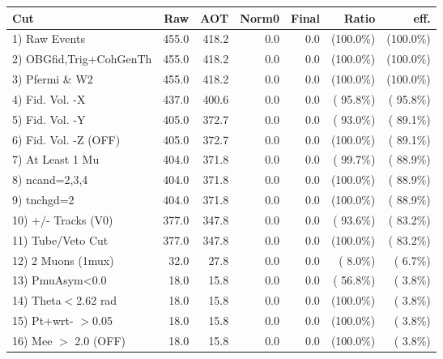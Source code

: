  \begin{table}[h!]\centering
 \begin{tabular}{||l||r|r|r|r|r|r||}
 \hline
 \hline
 Cut & Raw & AOT & Norm0 & Final & Ratio & eff.       \\
 \hline
  1) Raw Events           &        455.0 &        418.2 &          0.0 &          0.0 & (100.0\%) & (100.0\%) \\
  2) OBGfid,Trig+CohGenTh &        455.0 &        418.2 &          0.0 &          0.0 & (100.0\%) & (100.0\%) \\
  3) Pfermi \& W2         &        455.0 &        418.2 &          0.0 &          0.0 & (100.0\%) & (100.0\%) \\
  4) Fid. Vol. -X         &        437.0 &        400.6 &          0.0 &          0.0 & ( 95.8\%) & ( 95.8\%) \\
  5) Fid. Vol. -Y         &        405.0 &        372.7 &          0.0 &          0.0 & ( 93.0\%) & ( 89.1\%) \\
  6) Fid. Vol. -Z (OFF)   &        405.0 &        372.7 &          0.0 &          0.0 & (100.0\%) & ( 89.1\%) \\
  7) At Least 1 Mu        &        404.0 &        371.8 &          0.0 &          0.0 & ( 99.7\%) & ( 88.9\%) \\
  8) ncand=2,3,4          &        404.0 &        371.8 &          0.0 &          0.0 & (100.0\%) & ( 88.9\%) \\
  9) tnchgd=2             &        404.0 &        371.8 &          0.0 &          0.0 & (100.0\%) & ( 88.9\%) \\
 10) +/- Tracks (V0)      &        377.0 &        347.8 &          0.0 &          0.0 & ( 93.6\%) & ( 83.2\%) \\
 11) Tube/Veto Cut        &        377.0 &        347.8 &          0.0 &          0.0 & (100.0\%) & ( 83.2\%) \\
 12) 2 Muons (1mux)       &         32.0 &         27.8 &          0.0 &          0.0 & (  8.0\%) & (  6.7\%) \\
 13) PmuAsym<0.0          &         18.0 &         15.8 &          0.0 &          0.0 & ( 56.8\%) & (  3.8\%) \\
 14) Theta$<$2.62 rad     &         18.0 &         15.8 &          0.0 &          0.0 & (100.0\%) & (  3.8\%) \\
 15) Pt+wrt- $>$0.05      &         18.0 &         15.8 &          0.0 &          0.0 & (100.0\%) & (  3.8\%) \\
 16) Mee $>$ 2.0  (OFF)   &         18.0 &         15.8 &          0.0 &          0.0 & (100.0\%) & (  3.8\%) \\

\end{tabular}
\end{table}
